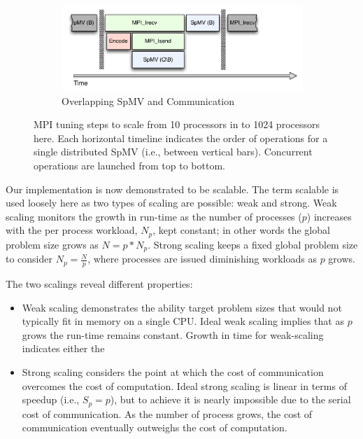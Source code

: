 \documentclass{report}
\begin{document}
\begin{figure}
\begin{subfigure}{0.6\textwidth}
\label{fig:no_decode_cpu}
\end{subfigure}
\begin{subfigure}{0.6\textwidth}
\centering
\includegraphics[width=\textwidth]{../figures/omnigraffle/OverlapCPU.pdf}
\caption{Overlapping SpMV and Communication}
\label{fig:overlap_cpu}
\end{subfigure}
\caption{MPI tuning steps to scale from 10 processors in \cite{BolligFlyerErlebacher2012} to 1024 processors here. Each horizontal timeline indicates the order of operations for a single distributed SpMV (i.e., between vertical bars). Concurrent operations are launched from top to bottom. } 
\label{fig:mpi_tuning}
\end{figure}

Our implementation is now demonstrated to be scalable. The term scalable is used loosely here as two types of scaling are possible: weak and strong. Weak scaling monitors the growth in run-time as the number of processes ($p$) increases with the per process workload, $N_p$, kept constant; in other words the global problem size grows as $N = p*N_p$. Strong scaling keeps a fixed global problem size to consider $N_p = \frac{N}{p}$, where processes are issued diminishing workloads as $p$ grows. 

The two scalings reveal different properties:
\begin{itemize} 
\item Weak scaling demonstrates the ability target problem sizes that would not typically fit in memory on a single CPU. Ideal weak scaling implies that as $p$ grows the run-time remains constant. Growth in time for weak-scaling indicates either the 
\item Strong scaling considers the point at which the cost of communication overcomes the cost of computation. Ideal strong scaling is linear in terms of speedup (i.e., $S_p = p$), but to achieve it is nearly impossible due to the serial cost of communication. As the number of process grows, the cost of communication eventually outweighs the cost of computation. 
\end{itemize}
 
\end{document}
